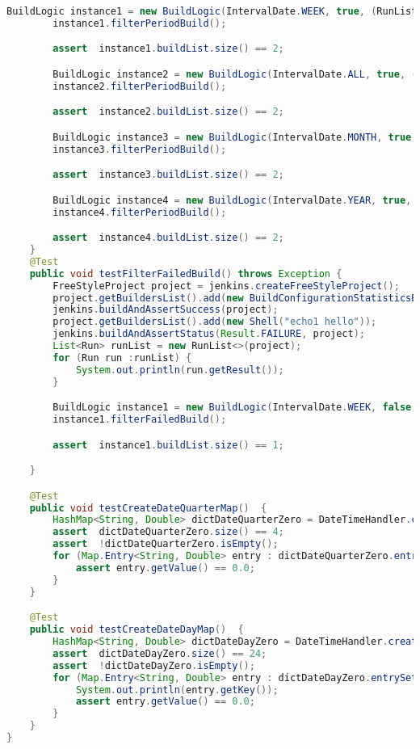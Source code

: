 \begin{lstlisting}[language=Java]
        BuildLogic instance1 = new BuildLogic(IntervalDate.WEEK, true, (RunList<Run>) runList);
        instance1.filterPeriodBuild();

        assert  instance1.buildList.size() == 2;

        BuildLogic instance2 = new BuildLogic(IntervalDate.ALL, true, (RunList<Run>) runList);
        instance2.filterPeriodBuild();

        assert  instance2.buildList.size() == 2;

        BuildLogic instance3 = new BuildLogic(IntervalDate.MONTH, true, (RunList<Run>) runList);
        instance3.filterPeriodBuild();

        assert  instance3.buildList.size() == 2;

        BuildLogic instance4 = new BuildLogic(IntervalDate.YEAR, true, (RunList<Run>) runList);
        instance4.filterPeriodBuild();

        assert  instance4.buildList.size() == 2;
    }
    @Test
    public void testFilterFailedBuild() throws Exception {
        FreeStyleProject project = jenkins.createFreeStyleProject();
        project.getBuildersList().add(new BuildConfigurationStatisticsBuilder());
        jenkins.buildAndAssertSuccess(project);
        project.getBuildersList().add(new Shell("echo1 hello"));
        jenkins.buildAndAssertStatus(Result.FAILURE, project);
        List<Run> runList = new RunList<>(project);
        for (Run run :runList) {
            System.out.println(run.getResult());
        }

        BuildLogic instance1 = new BuildLogic(IntervalDate.WEEK, false, (RunList<Run>) runList);
        instance1.filterFailedBuild();

        assert  instance1.buildList.size() == 1;

    }

    @Test
    public void testCreateDateQuarterMap()  {
        HashMap<String, Double> dictDateQuarterZero = DateTimeHandler.createDateQuarterMap();
        assert  dictDateQuarterZero.size() == 4;
        assert  !dictDateQuarterZero.isEmpty();
        for (Map.Entry<String, Double> entry : dictDateQuarterZero.entrySet()) {
            assert entry.getValue() == 0.0;
        }
    }

    @Test
    public void testCreateDateDayMap()  {
        HashMap<String, Double> dictDateDayZero = DateTimeHandler.createDateDayMap();
        assert  dictDateDayZero.size() == 24;
        assert  !dictDateDayZero.isEmpty();
        for (Map.Entry<String, Double> entry : dictDateDayZero.entrySet()) {
            System.out.println(entry.getKey());
            assert entry.getValue() == 0.0;
        }
    }
}
\end{lstlisting}


